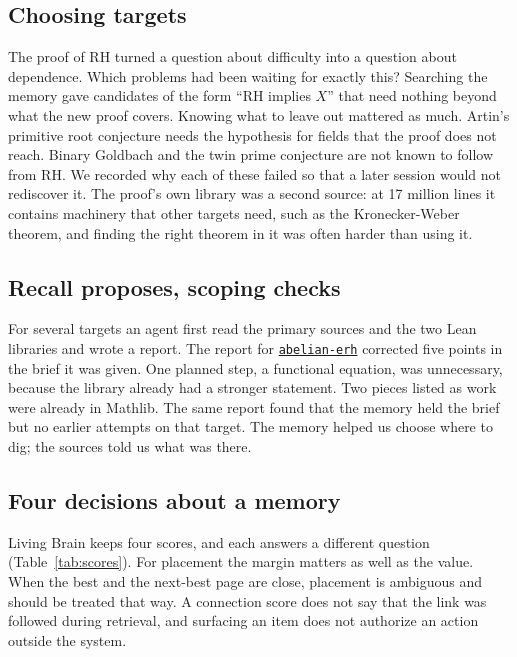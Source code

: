 \documentclass[11pt]{amsart}
\newcommand{\repo}[1]{\href{https://github.com/senamakel/#1}{\texttt{#1}}}
\begin{document}
\subsection*{Choosing targets} The proof of RH turned a question about difficulty into a question about dependence. Which problems had been waiting for exactly this? Searching the memory gave candidates of the form ``RH implies $X$'' that need nothing beyond what the new proof covers. Knowing what to leave out mattered as much. Artin's primitive root conjecture needs the hypothesis for fields that the proof does not reach. Binary Goldbach and the twin prime conjecture are not known to follow from RH. We recorded why each of these failed so that a later session would not rediscover it. The proof's own library was a second source: at 17 million lines it contains machinery that other targets need, such as the Kronecker-Weber theorem, and finding the right theorem in it was often harder than using it.

\subsection*{Recall proposes, scoping checks} For several targets an agent first read the primary sources and the two Lean libraries and wrote a report. The report for \repo{abelian-erh} \cite{r-abelian-erh} corrected five points in the brief it was given. One planned step, a functional equation, was unnecessary, because the library already had a stronger statement. Two pieces listed as work were already in Mathlib. The same report found that the memory held the brief but no earlier attempts on that target. The memory helped us choose where to dig; the sources told us what was there.

\subsection*{Four decisions about a memory} Living Brain keeps four scores, and each answers a different question (Table~\ref{tab:scores}). For placement the margin matters as well as the value. When the best and the next-best page are close, placement is ambiguous and should be treated that way. A connection score does not say that the link was followed during retrieval, and surfacing an item does not authorize an action outside the system.
\end{document}
